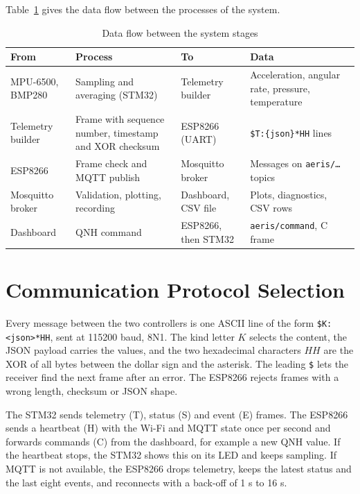 \documentclass[12pt,a4paper]{report}
\begin{document}
Table~\ref{tab:dfd} gives the data flow between the processes of the system.
\begin{table}[htbp]
\centering
\caption{Data flow between the system stages}
\label{tab:dfd}
\small
\begin{tabularx}{\textwidth}{>{\raggedright\arraybackslash}p{3cm}>{\raggedright\arraybackslash}p{3.4cm}>{\raggedright\arraybackslash}p{3.2cm}X}
\toprule
\textbf{From} & \textbf{Process} & \textbf{To} & \textbf{Data}\\
\midrule
MPU-6500, BMP280 & Sampling and averaging (STM32) & Telemetry builder & Acceleration, angular rate, pressure, temperature\\
Telemetry builder & Frame with sequence number, timestamp and XOR checksum & ESP8266 (UART) & \texttt{\$T:\{json\}*HH} lines\\
ESP8266 & Frame check and MQTT publish & Mosquitto broker & Messages on \texttt{aeris/\ldots} topics\\
Mosquitto broker & Validation, plotting, recording & Dashboard, CSV file & Plots, diagnostics, CSV rows\\
Dashboard & QNH command & ESP8266, then STM32 & \texttt{aeris/command}, C frame\\
\bottomrule
\end{tabularx}
\end{table}

\section{Communication Protocol Selection}
Every message between the two controllers is one ASCII line of the form \texttt{\$K:<json>*HH}, sent at 115200 baud, 8N1. The kind letter $K$ selects the content, the JSON payload carries the values, and the two hexadecimal characters $HH$ are the XOR of all bytes between the dollar sign and the asterisk. The leading \texttt{\$} lets the receiver find the next frame after an error. The ESP8266 rejects frames with a wrong length, checksum or JSON shape.

The STM32 sends telemetry (T), status (S) and event (E) frames. The ESP8266 sends a heartbeat (H) with the Wi-Fi and MQTT state once per second and forwards commands (C) from the dashboard, for example a new QNH value. If the heartbeat stops, the STM32 shows this on its LED and keeps sampling. If MQTT is not available, the ESP8266 drops telemetry, keeps the latest status and the last eight events, and reconnects with a back-off of 1 s to 16 s.
\end{document}
